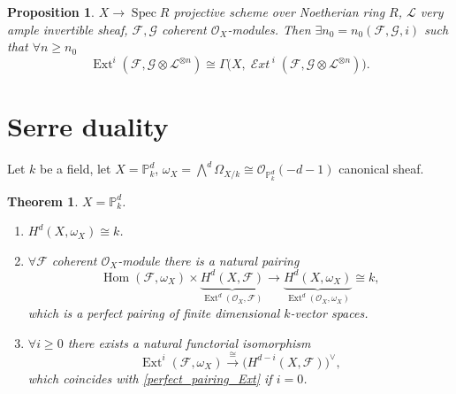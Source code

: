 \documentclass[12pt]{article}
\DeclareMathOperator{\Hom}{Hom}
\DeclareMathOperator{\Spec}{Spec}
\DeclareMathOperator{\Ext}{Ext}
\DeclareMathOperator{\shExt}{\mathcal{E}\textit{xt}\,}
\newtheorem*{proposition}{Proposition}
\newtheorem*{theorem}{Theorem}
\theoremstyle{definition}
\theoremstyle{remark}
\newtheorem*{comment}{Comment}
\begin{document}
\begin{comment}
The right hand side is (theoretically) already known from Algebra 2, and this tells us what the left hand side is. All this exists thanks to the fact that there exist enough invariants. These formulae don't need to be memorised.
\end{comment}

\begin{proposition}
$X\rightarrow\Spec R$ projective scheme over Noetherian ring $R$, $\mathcal{L}$ very ample invertible sheaf, $\mathcal{F},\mathcal{G}$ coherent $\mathcal{O}_X$-modules. Then $\exists n_0=n_0(\mathcal{F},\mathcal{G},i)$ such that $\forall n\geq n_0$
\[\Ext^i(\mathcal{F},\mathcal{G}\otimes\mathcal{L}^{\otimes n})\cong\Gamma\big(X,\shExt^i(\mathcal{F},\mathcal{G}\otimes\mathcal{L}^{\otimes n})\big).\]
\end{proposition}

\section{Serre duality}
Let $k$ be a field, let $X=\mathbb{P}_k^d$, $\omega_X=\bigwedge^d\Omega_{X/k}\cong\mathcal{O}_{\mathbb{P}_k^d}(-d-1)$ canonical sheaf.

\begin{theorem}
$X=\mathbb{P}_k^d$.

\begin{enumerate}[label=\arabic*)]
\item $H^d(X,\omega_X)\cong k$.

\item\label{perfect_pairing_Ext} $\forall\mathcal{F}$ coherent $\mathcal{O}_X$-module there is a natural pairing
\[\Hom(\mathcal{F},\omega_X)\times\underbrace{H^d(X,\mathcal{F})}_{\Ext^d(\mathcal{O}_X,\mathcal{F})}\longrightarrow\underbrace{H^d(X,\omega_X)}_{\Ext^d(\mathcal{O}_X,\omega_X)}\cong k,\]
which is a perfect pairing of finite dimensional $k$-vector spaces.

\item $\forall i\geq0$ there exists a natural functorial isomorphism
\[\Ext^i(\mathcal{F},\omega_X)\overset{\cong}{\longrightarrow}\big(H^{d-i}(X,\mathcal{F})\big)^{\vee},\]
which coincides with \ref{perfect_pairing_Ext} if $i=0$.
\end{enumerate}
\end{theorem}

\begin{comment}
Yoneda's description of the Ext (extension) groups gives the modules that fit into the exact sequence $\Ext^1(\mathcal{O}_X,\mathcal{F})$:
\[0\longrightarrow\mathcal{F}\longrightarrow\,?\longrightarrow\mathcal{O}_X\longrightarrow0;\]
$\Ext^2(\mathcal{O}_X,\mathcal{F})$:
\[0\longrightarrow\mathcal{F}\longrightarrow\,?\longrightarrow\,??\longrightarrow\mathcal{O}_X\longrightarrow0.\]
\end{comment}
\end{document}
